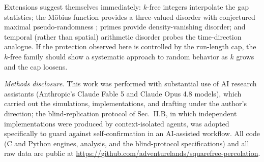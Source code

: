 \documentclass[aps,pre,twocolumn,superscriptaddress,nofootinbib]{revtex4-2}
\begin{document}
Extensions suggest themselves immediately: $k$-free integers interpolate the gap statistics;
the M\"obius function provides a three-valued disorder with conjectured maximal
pseudo-randomness \cite{Sarnak2011}; primes provide density-vanishing disorder; and temporal
(rather than spatial) arithmetic disorder probes the time-direction analogue. If the
protection observed here is controlled by the run-length cap, the $k$-free family should
show a systematic approach to random behavior as $k$ grows and the cap loosens.

\emph{Methods disclosure.} This work was performed with substantial use of AI research
assistants (Anthropic's Claude Fable 5 and Claude Opus 4.8 models), which carried out the simulations, implementations, and
drafting under the author's direction; the blind-replication protocol of
Sec.~II.B, in which independent implementations were produced by context-isolated agents,
was adopted specifically to guard against self-confirmation in an AI-assisted workflow. All
code (C and Python engines, analysis, and the blind-protocol specifications) and all raw
data are public at \url{https://github.com/adventurelands/squarefree-percolation}.
\end{document}
